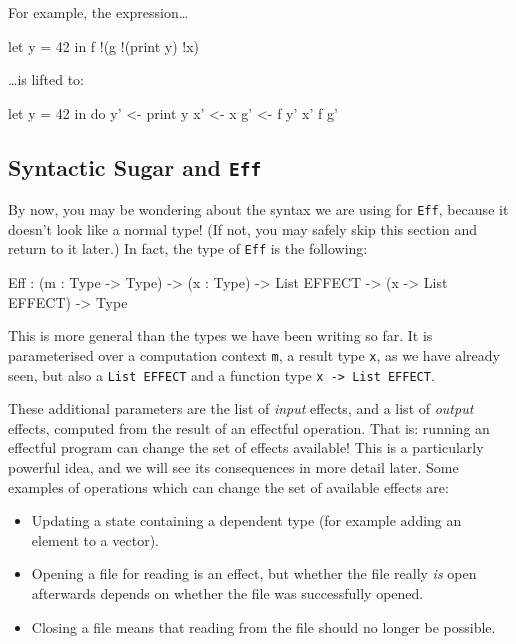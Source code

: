 For example, the expression\ldots

\begin{code}
let y = 42 in f !(g !(print y) !x) 
\end{code}

\ldots is lifted to:

\begin{code}
let y = 42 in do y' <- print y
                 x' <- x
                 g' <- f y' x'
                 f g'
\end{code}


\subsection{Syntactic Sugar and \texttt{Eff}}

By now, you may be wondering about the syntax we are using for \texttt{Eff}, because it doesn't look like a normal \Idris{} type!
(If not, you may safely skip this section and return to it later.)
In fact, the type of \texttt{Eff} is the following:

\begin{code}
Eff : (m : Type -> Type) ->
      (x : Type) ->
      List EFFECT -> (x -> List EFFECT) -> Type
\end{code}

\noindent
This is more general than the types we have been writing so far.
It is parameterised over a computation context \texttt{m}, a result type \texttt{x}, as we have already seen, but also a \texttt{List EFFECT} and a function type \texttt{x -> List EFFECT}.

These additional parameters are the list of \emph{input} effects, and a list of \emph{output} effects, computed from the result of an effectful operation.
That is: running an effectful program can change the set of effects available!
This is a particularly powerful idea, and we will see its consequences in more detail later.
Some examples of operations which can change the set of available effects are:

\begin{itemize}
\item Updating a state containing a dependent type (for example adding an element to a vector).
\item Opening a file for reading is an effect, but whether the file really
\emph{is} open afterwards depends on whether the file was successfully opened.
\item Closing a file means that reading from the file should no longer be possible.
\end{itemize}

